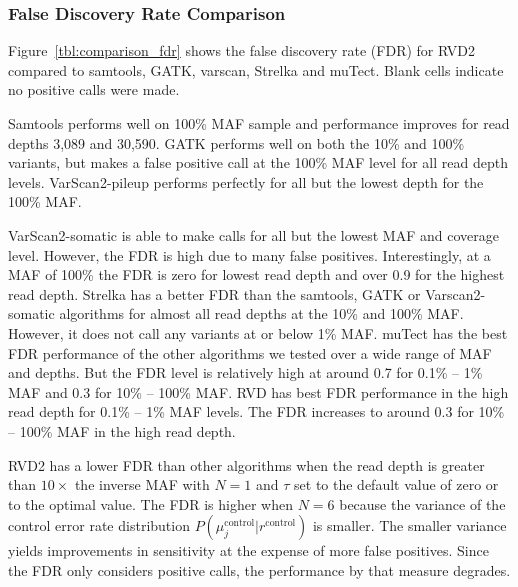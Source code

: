 \documentclass{bioinfo}
\begin{document}
\subsubsection*{False Discovery Rate Comparison}

Figure~\ref{tbl:comparison_fdr} shows the false discovery rate (FDR) for RVD2 compared to samtools, GATK, varscan, Strelka and muTect. Blank cells indicate no positive calls were made.

Samtools performs well on 100\% MAF sample and performance improves for read depths 3,089 and 30,590. GATK performs well on both the 10\% and 100\% variants, but makes a false positive call at the 100\% MAF level for all read depth levels. VarScan2-pileup performs perfectly for all but the lowest depth for the 100\% MAF.

VarScan2-somatic is able to make calls for all but the lowest MAF and coverage level. However, the FDR is high due to many false positives. Interestingly, at a MAF of 100\% the FDR is zero for lowest read depth and over 0.9 for the highest read depth. Strelka has a better FDR than the samtools, GATK or Varscan2-somatic algorithms for almost all read depths at the 10\% and 100\% MAF. However, it does not call any variants at or below 1\% MAF.  muTect has the best FDR performance of the other algorithms we tested over a wide range of MAF and depths. But the FDR level is relatively high at around 0.7 for 0.1\% -- 1\% MAF and 0.3 for 10\% -- 100\% MAF. RVD has best FDR performance in the high read depth for 0.1\% -- 1\% MAF levels. The FDR increases to around 0.3 for 10\% -- 100\% MAF in the high read depth.

RVD2 has a lower FDR than other algorithms when the read depth is greater than $10\times$ the inverse MAF with $N=1$ and $\tau$ set to the default value of zero or to the optimal value. The FDR is higher when $N=6$ because the variance of the control error rate distribution $P(\mu_j^{\text{control}} | r^{\text{control}})$ is smaller. The smaller variance yields improvements in sensitivity at the expense of more false positives. Since the FDR only considers positive calls, the performance by that measure degrades.

\vspace{-10pt}
\end{document}

